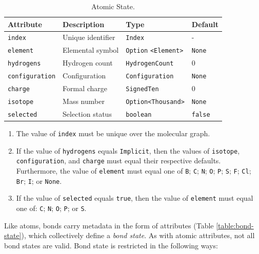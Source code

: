 \documentclass{article}
\def\ttt{\texttt}
\begin{document}
\begin{table}
\caption{Atomic State.}
\centering
\begin{tabular}{l L L l}
    \hline
    Attribute & Description & Type & Default \\
    \hline
    \ttt{index} & Unique identifier &\ttt{Index} & - \\
    \ttt{element} & Elemental symbol & \ttt{Option} \ttt{<Element>} & \ttt{None} \\
    \ttt{hydrogens} & Hydrogen count & \ttt{HydrogenCount} & 0 \\
    \ttt{configuration} & Configuration & \ttt{Configuration} & \ttt{None} \\
    \ttt{charge} & Formal charge & \ttt{SignedTen} & 0 \\
    \ttt{isotope} & Mass number & \ttt{Option<Thousand>} & \ttt{None} \\
    \ttt{selected} & Selection status & \ttt{boolean} & \ttt{false} \\
    \hline
\end{tabular}
\label{table:atomic-state}
\end{table}

\begin{enumerate}
    \item{The value of \ttt{index} must be unique over the molecular graph.}
    \item{If the value of \ttt{hydrogens} equals \ttt{Implicit}, then the values of \ttt{isotope}, \ttt{configuration}, and \ttt{charge} must equal their respective defaults. Furthermore, the value of \ttt{element} must equal one of \ttt{B}; \ttt{C}; \ttt{N}; \ttt{O}; \ttt{P}; \ttt{S}; \ttt{F}; \ttt{Cl}; \ttt{Br}; \ttt{I}; or \ttt{None}.}
    \item{If the value of \ttt{selected} equals \ttt{true}, then the value of \ttt{element} must equal one of: \ttt{C}; \ttt{N}; \ttt{O}; \ttt{P}; or \ttt{S}.}
\end{enumerate}

Like atoms, bonds carry metadata in the form of attributes (Table \ref{table:bond-state}), which collectively define a \textit{bond state}. As with atomic attributes, not all bond states are valid. Bond state is restricted in the following ways:
\end{document}
